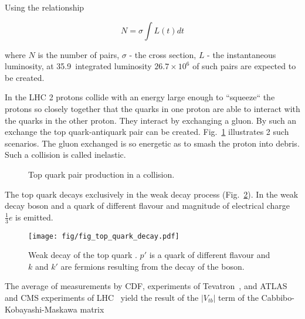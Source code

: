Using the relationship

\begin{equation}
N=\sigma\int L(t)dt
\end{equation}

\noindent where $N$ is the number of \ttbar pairs, $\sigma$ - the \ttbar cross section, $L$ - the instantaneous luminosity, at 35.9~\fbinv integrated luminosity $26.7\times10^{6}$ of such pairs are expected to be created. 

In the LHC 2 protons collide with an energy large enough to ``squeeze`` the protons so closely together that the quarks in one proton are able to interact with the quarks in the other proton. They interact by exchanging a gluon. By such an exchange the top quark-antiquark pair can be created. Fig.~\ref{fig:top_quark_productions} illustrates 2 such scenarios. The gluon exchanged is so energetic as to smash the proton into debris. Such a collision is called inelastic.

\begin{figure}[h!]
  \centering
  \def\twidth{0.45}
  \hfil
  \caption{Top quark pair production in a \Pp\Pp collision.}
  \label{fig:top_quark_productions}
\end{figure}

The top quark decays exclusively in the weak decay process (Fig.~\ref{fig:quark_decay}). In the weak decay \PW boson and a quark of different flavour and magnitude of electrical charge $\frac{1}{3}e$ is emitted. 

\begin{figure}[H]
  \centering
  \texttt{[image: fig/fig\_top\_quark\_decay.pdf]}
  \caption{Weak decay of the top quark \cPqt. $p'$ is a quark of different flavour and $k$ and $k'$ are fermions resulting from the decay of the \PW boson.}
  \label{fig:quark_decay}
\end{figure}

The average of measurements by CDF, \DZERO experiments of Tevatron~\cite{Aaltonen:2015cra}, and ATLAS and CMS experiments of LHC~\cite{twiki:tt_curve_toplhcwg_sep18} yield the result of the $|V_{tb}|$ term of the Cabbibo-Kobayashi-Maskawa matrix

